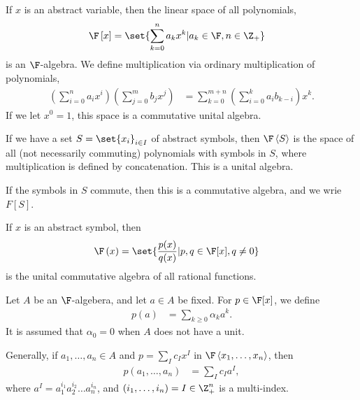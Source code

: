 \documentclass[10pt]{mypackage}
\begin{document}
\begin{example}
  If $x$ is an abstract variable, then the linear space of all polynomials,
  \begin{align*}
    \F\left[x\right] &= \set{\sum_{k=0}^{n}a_kx^k | a_k\in \F,n\in \Z_{+}}
  \end{align*}
  is an $\F$-algebra. We define multiplication via ordinary multiplication of polynomials,
  \begin{align*}
    \left(\sum_{i=0}^{n}a_ix^i\right)\left(\sum_{j=0}^{m}b_jx^j\right) &= \sum_{k=0}^{m+n}\left(\sum_{i=0}^{k}a_ib_{k-i}\right)x^k.
  \end{align*}
  If we let $x^0 = 1$, this space is a commutative unital algebra.
\end{example}
\begin{example}
  If we have a set $S = \set{x_i}_{i\in I}$ of abstract symbols, then $\F \left\langle S \right\rangle$ is the space of all (not necessarily commuting) polynomials with symbols in $S$, where multiplication is defined by concatenation. This is a unital algebra.\newline

  If the symbols in $S$ commute, then this is a commutative algebra, and we wrie $F\left[S\right]$.
\end{example}
\begin{example}
  If $x$ is an abstract symbol, then
  \begin{align*}
    \F\left(x\right) &= \set{\frac{p(x)}{q(x)} | p,q\in \F[x],q\neq 0}
  \end{align*}
  is the unital commutative algebra of all rational functions.
\end{example}
\begin{definition}
  Let $A$ be an $\F$-algebera, and let $a\in A$ be fixed. For $p \in \F[x]$, we define
  \begin{align*}
    p(a) &= \sum_{k\geq 0}\alpha_ka^k.
  \end{align*}
  It is assumed that $\alpha_0 = 0$ when $A$ does not have a unit.\newline

  Generally, if $a_1,\dots,a_n\in A$ and $p = \sum_{I}c_Ix^I$ in $\F \left\langle x_1,\dots,x_n \right\rangle$, then
  \begin{align*}
    p\left(a_1,\dots,a_n\right) &= \sum_{I}c_Ia^I,
  \end{align*}
  where $a^I = a_1^{i_1}a_2^{i_2}\dots a_n^{i_n}$, and $\left(i_1,\dots,i_n\right) = I \in \Z^{n}_{+}$ is a multi-index.
\end{definition}
\end{document}
